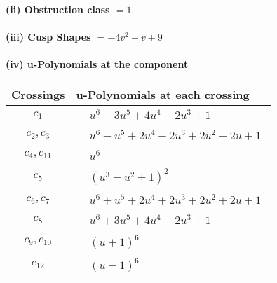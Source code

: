 \documentclass[1p]{elsarticle_modified}
\theoremstyle{definition}
\begin{document}
\flushleft \textbf{(ii) Obstruction class $= 1$}\\~\\
\flushleft \textbf{(iii) Cusp Shapes $= -4 v^2+v+9$}\\~\\
\newpage\renewcommand{\arraystretch}{1}
\flushleft \textbf{(iv) u-Polynomials at the component}\newline \\
\begin{tabular}{m{50pt}|m{274pt}}
Crossings & \hspace{64pt}u-Polynomials at each crossing \\
\hline $$\begin{aligned}c_{1}\end{aligned}$$&$\begin{aligned}
&u^6-3 u^5+4 u^4-2 u^3+1
\end{aligned}$\\
\hline $$\begin{aligned}c_{2},c_{3}\end{aligned}$$&$\begin{aligned}
&u^6- u^5+2 u^4-2 u^3+2 u^2-2 u+1
\end{aligned}$\\
\hline $$\begin{aligned}c_{4},c_{11}\end{aligned}$$&$\begin{aligned}
&u^6
\end{aligned}$\\
\hline $$\begin{aligned}c_{5}\end{aligned}$$&$\begin{aligned}
&(u^3- u^2+1)^2
\end{aligned}$\\
\hline $$\begin{aligned}c_{6},c_{7}\end{aligned}$$&$\begin{aligned}
&u^6+u^5+2 u^4+2 u^3+2 u^2+2 u+1
\end{aligned}$\\
\hline $$\begin{aligned}c_{8}\end{aligned}$$&$\begin{aligned}
&u^6+3 u^5+4 u^4+2 u^3+1
\end{aligned}$\\
\hline $$\begin{aligned}c_{9},c_{10}\end{aligned}$$&$\begin{aligned}
&(u+1)^6
\end{aligned}$\\
\hline $$\begin{aligned}c_{12}\end{aligned}$$&$\begin{aligned}
&(u-1)^6
\end{aligned}$\\
\hline
\end{tabular}\\~\\
\end{document}
